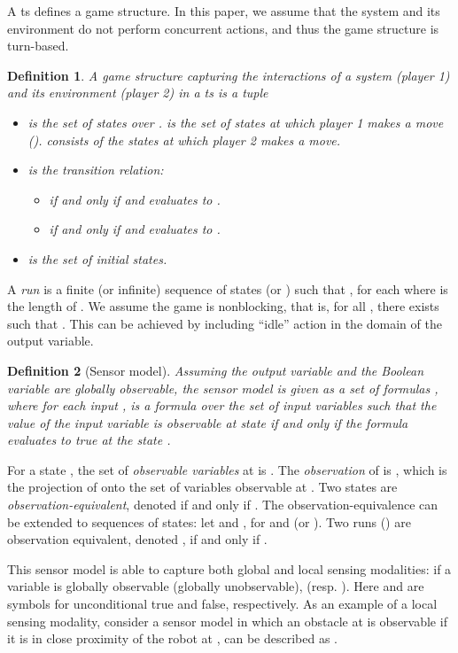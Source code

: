 \documentclass[letterpaper, 10 pt, conference]{ieeeconf}
\newtheorem{definition}{Definition}
\begin{document}
A  \ac{ts}  defines a game structure. In
this paper, we
assume that the system and its environment do not perform concurrent
actions, and thus the game structure is turn-based.
  \begin{definition} A \emph{game structure} capturing the
    interactions of a system (player 1) and its environment (player 2)
    in a \ac{ts}  is a tuple 
    \begin{itemize}
\item  is the set of states over .  is the set of states at which player 1 makes a
  move ().  consists of the states at
  which player 2 makes a move.
 \item  is the transition relation: 
\begin{itemize}
 \item  if and only if 
  and  evaluates to .
\item  if and only if  and
   evaluates to .
\end{itemize}
 \item  is the set of
   initial states.
\end{itemize} 
\end{definition}
A \emph{run} is a finite (or infinite) sequence of states  (or ) such
that , for each 
where  is the length of . We assume the game is
nonblocking, that is, for all , there exists  such
that . This can be achieved by including 
``idle'' action in the domain of the output variable.



\begin{definition}[Sensor model]
  Assuming the output variable  and the Boolean variable  are
  globally observable, the sensor model is given as a set of formulas
  , where for each input ,
   is a formula over the set of input variables 
  such that the value of the input variable  is observable at state
   if and only if the formula  evaluates to true at
  the state .
\end{definition}

For a state , the set of \emph{observable variables} at  is
.  The \emph{observation} of  is , which is the projection of  onto the set of
variables observable at .  Two states  are \emph{
  observation-equivalent}, denoted  if and only if
. The observation-equivalence can be
extended to sequences of states: let  and , for  and (or ). Two runs () are observation equivalent, denoted ,
if and only if .

This sensor model is able to capture both global and local sensing
modalities: if a variable  is globally observable (globally
unobservable),  (resp. ). Here  and  are symbols for unconditional true
and false, respectively. As an example of a local sensing modality,
consider a sensor model in which an obstacle at  is
observable if it is in close proximity of the robot at , can be
described as .
\end{document}
